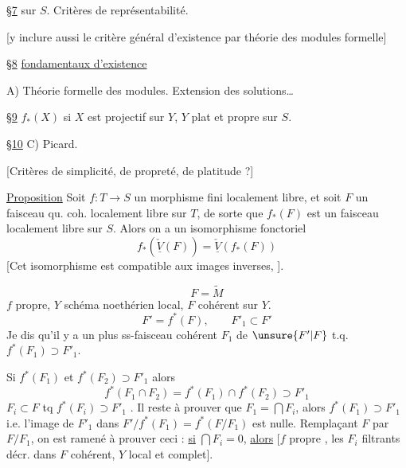 \uline{\S7}  sur $S$. Critères de représentabilité.

[y inclure aussi le critère général d'existence par théorie des modules formelle]

\uline{\S8}    \uline{fondamentaux d'existence}

A) Théorie formelle des modules. Extension des solutions\ldots

\uline{\S9}  $f_*(X)$ si $X$ est projectif sur $Y$, $Y$ plat et propre sur $S$.

\uline{\S10} C) Picard.

[Critères de simplicité, de propreté, de platitude ?]

\uline{Proposition} Soit $f:T\to S$ un morphisme fini localement libre, et soit  $F$ un faisceau qu. coh. localement libre sur $T$, de sorte que $f_*(F)$ est un faisceau  localement libre sur $S$. Alors on a un isomorphisme fonctoriel
\[
\boxed{f_*(\underline{\check V}(F))=\underline{\check V}(f_*(F))}
\]
[Cet isomorphisme est compatible aux images inverses,  ].

\[
F=\widetilde M
\]
$f$  propre, $Y$ schéma noethérien local, $F$ cohérent sur $Y$.
\[
F'=f^*(F),\qquad F'_1\subset F'
\]
 Je dis qu'il y a un plus  ss-faisceau cohérent $F_1$ de $\unsure{F'|F}$ t.q. $f^*(F_1)\supset F'_1$.

Si $f^*(F_1)$ et $f^*(F_2)\supset F'_1$ alors
\[
f^*(F_1\cap F_2)=f^*(F_1)\cap f^*(F_2)\supset F'_1
\]
$F_i\subset F$ tq $f^*(F_i)\supset F'_1$  . Il reste à prouver que $F_1=\bigcap F_i$, alors $f^*(F_1)\supset F'_1$ i.e. l'image de $F'_1$ dans $F'/f^*(F_1)=f^*(F/F_1)$ est nulle. Remplaçant $F$ par $F/F_1$, on est ramené à prouver ceci : \uline{si} $\bigcap F_i=0$, \uline{alors}   [$f$ propre , les $F_i$ filtrants décr. dans $F$ cohérent, $Y$ local et complet].

